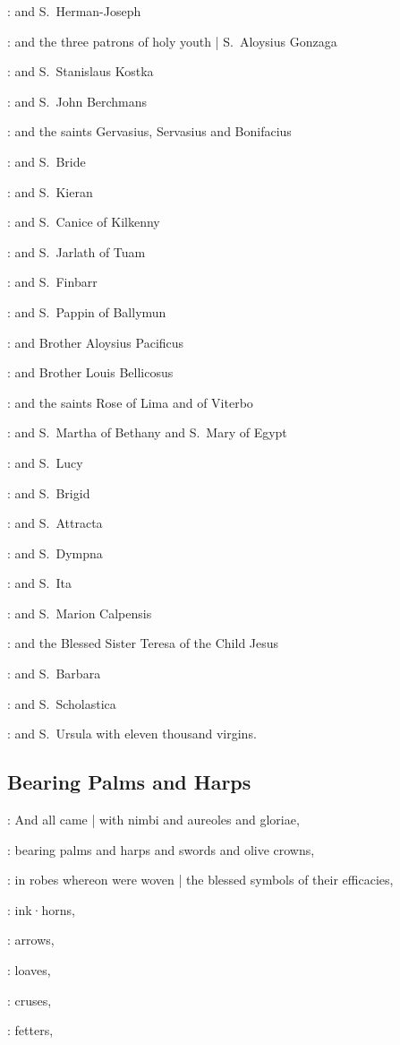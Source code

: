 :
and S.~Herman-Joseph

:
and the three patrons of holy youth |
S.~Aloysius Gonzaga

:
and S.~Stanislaus Kostka

:
and S.~John Berchmans

:
and the saints Gervasius,
Servasius
and Bonifacius

:
and S.~Bride

:
and S.~Kieran

:
and S.~Canice of Kilkenny

:
and S.~Jarlath of Tuam

:
and S.~Finbarr

:
and S.~Pappin of Ballymun

:
and Brother Aloysius Pacificus

:
and Brother Louis Bellicosus

:
and the saints Rose of Lima
and of Viterbo

:
and S.~Martha of Bethany
and S.~Mary of Egypt

:
and S.~Lucy

:
and S.~Brigid

:
and S.~Attracta

:
and S.~Dympna

:
and S.~Ita

:
and S.~Marion Calpensis

:
and the Blessed Sister Teresa of the Child Jesus

:
and S.~Barbara

:
and S.~Scholastica

:
and S.~Ursula with eleven thousand virgins.


\subsection*{Bearing Palms and Harps}

:
And all came |
with nimbi and aureoles and gloriae,

:
bearing palms and harps and swords and olive crowns,

:
in robes whereon were woven |
the blessed symbols of their efficacies,

:
ink·horns,

:
arrows,

:
loaves,

:
cruses,

:
fetters,


